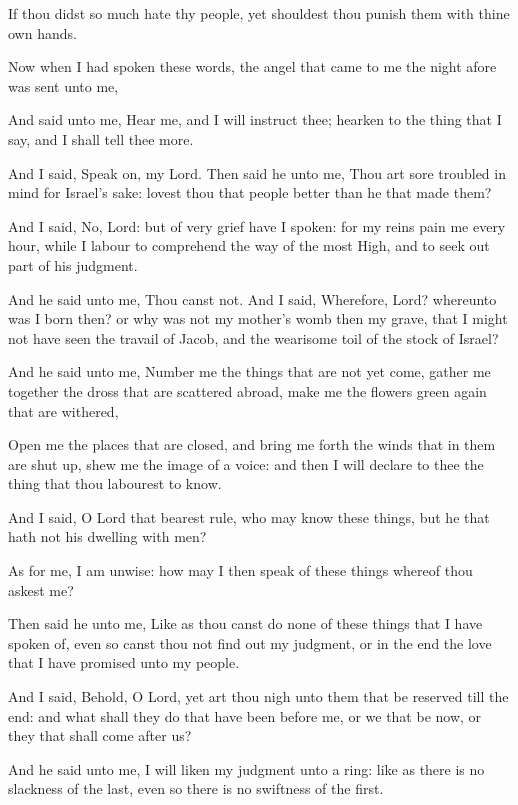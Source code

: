 {\par }{\PP {}If thou didst so much hate thy people, yet shouldest thou punish them with thine own hands.
\par }{\PP {}Now when I had spoken these words, the angel that came to me the night afore was sent unto me,
\par }{\PP {}And said unto me, Hear me, and I will instruct thee; hearken to the thing that I say, and I shall tell thee more.
\par }{\PP {}And I said, Speak on, my Lord. Then said he unto me, Thou art sore troubled in mind for Israel’s sake: lovest thou that people better than he that made them?
\par }{\PP {}And I said, No, Lord: but of very grief have I spoken: for my reins pain me every hour, while I labour to comprehend the way of the most High, and to seek out part of his judgment.
\par }{\PP {}And he said unto me, Thou canst not. And I said, Wherefore, Lord? whereunto was I born then? or why was not my mother’s womb then my grave, that I might not have seen the travail of Jacob, and the wearisome toil of the stock of Israel?
\par }{\PP {}And he said unto me, Number me the things that are not yet come, gather me together the dross that are scattered abroad, make me the flowers green again that are withered,
\par }{\PP {}Open me the places that are closed, and bring me forth the winds that in them are shut up, shew me the image of a voice: and then I will declare to thee the thing that thou labourest to know.
\par }{\PP {}And I said, O Lord that bearest rule, who may know these things, but he that hath not his dwelling with men?
\par }{\PP {}As for me, I am unwise: how may I then speak of these things whereof thou askest me?
\par }{\PP {}Then said he unto me, Like as thou canst do none of these things that I have spoken of, even so canst thou not find out my judgment, or in the end the love that I have promised unto my people.
\par }{\PP {}And I said, Behold, O Lord, yet art thou nigh unto them that be reserved till the end: and what shall they do that have been before me, or we that be now, or they that shall come after us?
\par }{\PP {}And he said unto me, I will liken my judgment unto a ring: like as there is no slackness of the last, even so there is no swiftness of the first.
}

